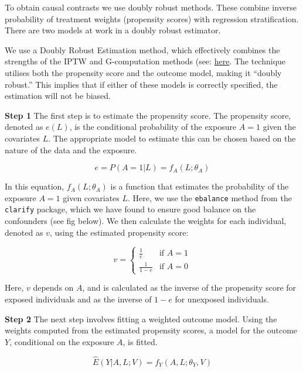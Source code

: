 \documentclass[
  singlecolumn]{report}
\begin{document}
To obtain causal contrasts we use doubly robust methods. These combine
inverse probability of treatment weights (propensity scores) with
regression stratification. There are two models at work in a doubly
robust estimator.

We use a Doubly Robust Estimation method, which effectively combines the
strengths of the IPTW and G-computation methods (see:
\href{https://go-bayes.github.io/psych-434-2023/content/09-content.html\#comprehensive-checklist-for-detailed-reporting-of-a-causal-inferenctial-study-e.g.-assessment-3-option-2}{here}.
The technique utilises both the propensity score and the outcome model,
making it ``doubly robust.'' This implies that if either of these models
is correctly specified, the estimation will not be biased.

\textbf{Step 1} The first step is to estimate the propensity score. The
propensity score, denoted as \(e(L)\), is the conditional probability of
the exposure \(A = 1\) given the covariates \(L\). The appropriate model
to estimate this can be chosen based on the nature of the data and the
exposure.

\[e = P(A = 1 | L) = f_A(L; \theta_A)\]

In this equation, \(f_A(L; \theta_A)\) is a function that estimates the
probability of the exposure \(A = 1\) given covariates \(L\). Here, we
use the \texttt{ebalance} method from the \texttt{clarify} package,
which we have found to ensure good balance on the confounders (see fig
below). We then calculate the weights for each individual, denoted as
\(v\), using the estimated propensity score:

\[
v = 
\begin{cases} 
\frac{1}{e} & \text{if } A = 1 \\
\frac{1}{1-e} & \text{if } A = 0 
\end{cases}
\]

Here, \(v\) depends on \(A\), and is calculated as the inverse of the
propensity score for exposed individuals and as the inverse of \(1-e\)
for unexposed individuals.

\textbf{Step 2} The next step involves fitting a weighted outcome model.
Using the weights computed from the estimated propensity scores, a model
for the outcome \(Y\), conditional on the exposure \(A\), is fitted.

\[ \hat{E}(Y|A, L; V) = f_Y(A, L ; \theta_Y, V) \]
\end{document}
